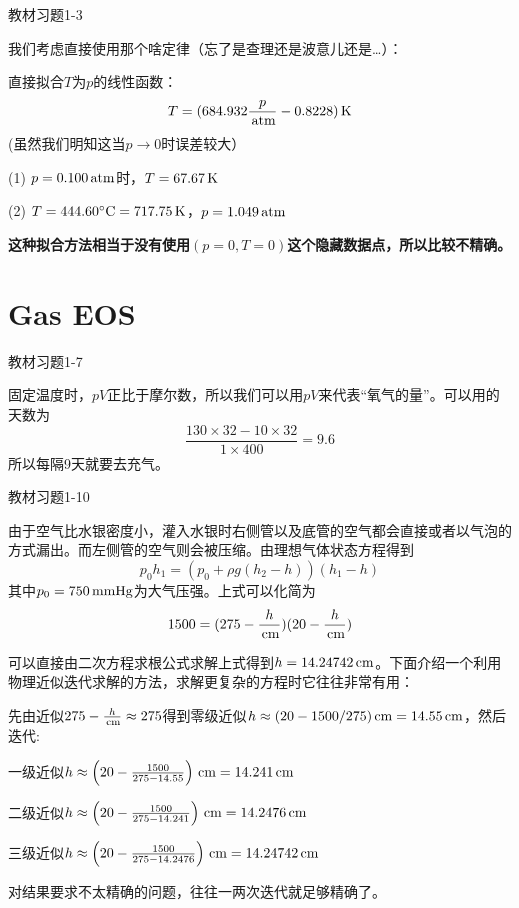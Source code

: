 \documentclass[CJK]{beamer}
\begin{document}
\begin{frame}
\bch
{\blue 教材习题1-3}

\skipline

{\scriptsize
我们考虑直接使用那个啥定律（忘了是查理还是波意儿还是…）：

直接拟合$T$为$p$的线性函数：
$$ T = (684.932\frac{p}{\,\mathrm{atm}} -0.8228)\,\mathrm{K}$$
(虽然我们明知这当$p\rightarrow 0$时误差较大）

\bitem
\item[(1)]{$p=0.100\,\mathrm{atm}$时，$T=67.67\,\mathrm{K}$}
\item[(2)]{$T=444.60^\circ \mathrm{C} = 717.75\,\mathrm{K}$，$p  = 1.049\,\mathrm{atm}$}
\eitem

{\bf 这种拟合方法相当于没有使用$(p=0, T=0)$这个隐藏数据点，所以比较不精确。}

}

\ech
\end{frame}


\section{Gas EOS}



\begin{frame}
\bch
{\blue 教材习题1-7}

\skipline

{\small
固定温度时，$pV$正比于摩尔数，所以我们可以用$pV$来代表“氧气的量”。可以用的天数为
$$\frac{130\times 32 - 10\times 32}{1\times 400} = 9.6 $$
所以每隔9天就要去充气。
}
\ech
\end{frame}



\begin{frame}
\bch
{\blue 教材习题1-10}

{\scriptsize
由于空气比水银密度小，灌入水银时右侧管以及底管的空气都会直接或者以气泡的方式漏出。而左侧管的空气则会被压缩。由理想气体状态方程得到
$$ p_0 h_1 = \left(p_0+\rho g (h_2-h)\right) (h_1-h)$$
其中$p_0 =750 \,\mathrm{mmHg}$为大气压强。上式可以化简为
$$ 1500 = (275- \frac{h}{\,\mathrm{cm}}) (20 - \frac{h}{\,\mathrm{cm}})$$

可以直接由二次方程求根公式求解上式得到$h=14.24742\,\mathrm{cm}$。下面介绍一个利用物理近似迭代求解的方法，求解更复杂的方程时它往往非常有用：

先由近似$275-\frac{h}{\,\mathrm{cm}}\approx 275$得到零级近似$h \approx (20-1500/275)\,\mathrm{cm}=14.55\,\mathrm{cm}$，然后迭代:

一级近似$h\approx \left(20 - \frac{1500}{275-14.55}\right)\,\mathrm{cm} = 14.241\,\mathrm{cm}$

二级近似$h\approx \left(20 - \frac{1500}{275-14.241}\right)\,\mathrm{cm} = 14.2476\,\mathrm{cm}$

三级近似$h\approx \left(20 - \frac{1500}{275-14.2476}\right)\,\mathrm{cm} = 14.24742\,\mathrm{cm}$

对结果要求不太精确的问题，往往一两次迭代就足够精确了。
}
\ech
\end{frame}
\end{document}
